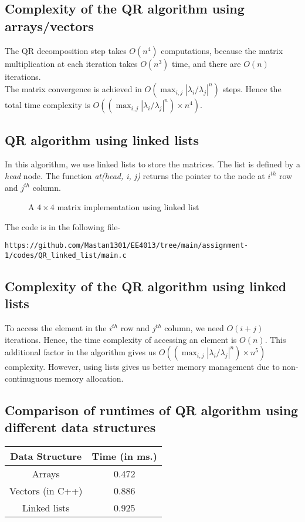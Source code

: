 \documentclass[journal,12pt,twocolumn]{IEEEtran}
\begin{document}
\subsection{Complexity of the QR algorithm using arrays/vectors}
The QR decomposition step takes $O(n ^ 4)$ computations, because the matrix multiplication at each iteration takes $O(n^3)$ time, and there are $O(n)$ iterations. \\
    The matrix convergence is achieved in $O(\max_{i, j} |\lambda_i / \lambda_j| ^ n)$ steps. Hence the total time complexity is $O((\max_{i, j} |\lambda_i / \lambda_j| ^ n) \times n ^ 4)$.
    
\subsection{QR algorithm using linked lists}
In this algorithm, we use linked lists to store the matrices. The list is defined by a \textit{head} node. The function \textit{at(head, i, j)} returns the pointer to the node at $i^{th}$ row and $j^{th}$ column. 

\begin{figure}[h!]
	\begin{center}
		\resizebox{\columnwidth/1}{!}{}
	\end{center}
	\caption{A $4 \times 4$ matrix implementation using linked list}
	\label{fig:fig5}
\end{figure}


The code is in the following file-
\begin{lstlisting}
https://github.com/Mastan1301/EE4013/tree/main/assignment-1/codes/QR_linked_list/main.c
\end{lstlisting}

\subsection{Complexity of the QR algorithm using linked lists}   
To access the element in the $i^{th}$ row and $j^{th}$ column, we need $O(i + j)$ iterations. Hence, the time complexity of accessing an element is $O(n)$. This additional factor in the algorithm gives us $O((\max_{i, j} |\lambda_i / \lambda_j| ^ n) \times n ^ 5)$ complexity. However, using lists gives us better memory management due to non-continuguous memory allocation.

\subsection{Comparison of runtimes of QR algorithm using different data structures}
\begin{tabular}{| c | c |}
     \hline
     \textbf{Data Structure} &  \textbf{Time (in ms.)}\\
     \hline
     Arrays & 0.472 \\ 
     \hline
     Vectors (in C++) & 0.886 \\
     \hline
     Linked lists & 0.925 \\
     \hline
\end{tabular}
\end{document}
